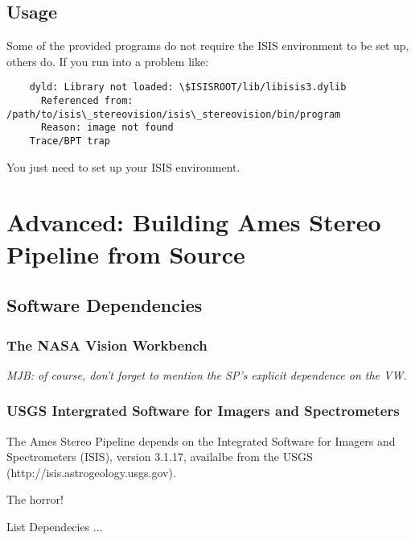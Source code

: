 \subsection*{Usage}

Some of the provided programs do not require the ISIS environment
to be set up, others do.  If you run into a problem like:
\begin{verbatim}
    dyld: Library not loaded: \$ISISROOT/lib/libisis3.dylib
      Referenced from: /path/to/isis\_stereovision/isis\_stereovision/bin/program
      Reason: image not found
    Trace/BPT trap
\end{verbatim}

You just need to set up your ISIS environment.


\section{Advanced: Building Ames Stereo Pipeline from Source}
\subsection{Software Dependencies}

\subsubsection{The NASA Vision Workbench}

\emph{MJB: of course, don't forget to mention the SP's explicit dependence on the VW.}

\subsubsection{USGS Intergrated Software for Imagers and Spectrometers}

The Ames Stereo Pipeline depends on the Integrated Software for Imagers and Spectrometers (ISIS), version 3.1.17, availalbe from the USGS (http://isis.astrogeology.usgs.gov).  


The horror!

List Dependecies ...


